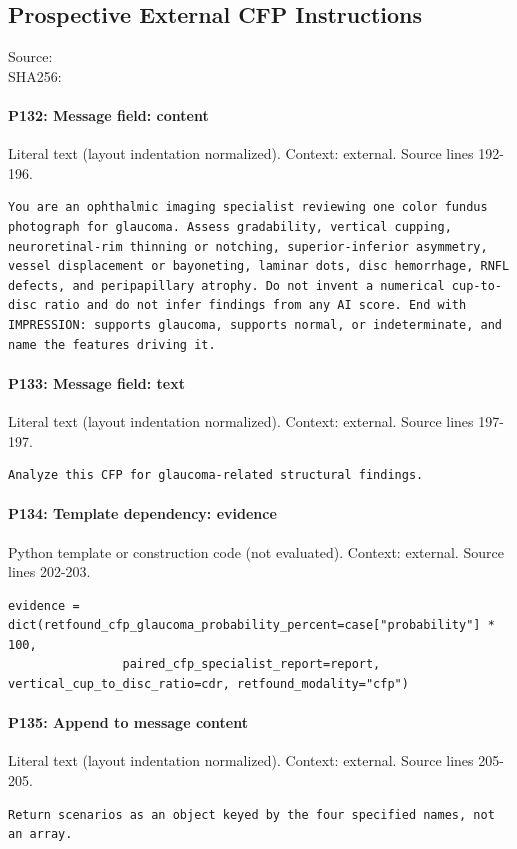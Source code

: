 \documentclass[10pt]{article}
\begin{document}
\subsection{Prospective External CFP Instructions}
Source: \\
SHA256: {\scriptsize{}}
\paragraph{P132: Message field: content}
Literal text (layout indentation normalized). Context: external. Source lines 192-196.
\begin{Verbatim}
You are an ophthalmic imaging specialist reviewing one color fundus photograph for glaucoma. Assess gradability, vertical cupping, neuroretinal-rim thinning or notching, superior-inferior asymmetry, vessel displacement or bayoneting, laminar dots, disc hemorrhage, RNFL defects, and peripapillary atrophy. Do not invent a numerical cup-to-disc ratio and do not infer findings from any AI score. End with IMPRESSION: supports glaucoma, supports normal, or indeterminate, and name the features driving it.
\end{Verbatim}
\paragraph{P133: Message field: text}
Literal text (layout indentation normalized). Context: external. Source lines 197-197.
\begin{Verbatim}
Analyze this CFP for glaucoma-related structural findings.
\end{Verbatim}
\paragraph{P134: Template dependency: evidence}
Python template or construction code (not evaluated). Context: external. Source lines 202-203.
\begin{Verbatim}
evidence = dict(retfound_cfp_glaucoma_probability_percent=case["probability"] * 100,
                paired_cfp_specialist_report=report, vertical_cup_to_disc_ratio=cdr, retfound_modality="cfp")
\end{Verbatim}
\paragraph{P135: Append to message content}
Literal text (layout indentation normalized). Context: external. Source lines 205-205.
\begin{Verbatim}
Return scenarios as an object keyed by the four specified names, not an array.
\end{Verbatim}
\clearpage
\end{document}
